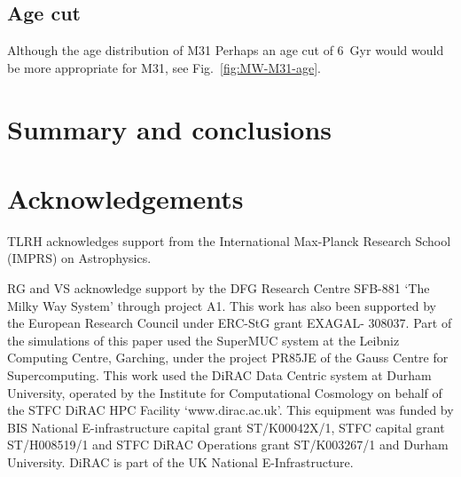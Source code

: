 \documentclass[a4paper,fleqn,usenatbib]{mnras}
\begin{document}
\subsection{Age cut}
Although the age distribution of M31 Perhaps an age cut of 6~Gyr would would be more 
appropriate for M31, see Fig.~\ref{fig:MW-M31-age}.




\section{Summary and conclusions}
\label{sec:conclusions}


\section*{Acknowledgements}
TLRH acknowledges support from the International Max-Planck Research School (IMPRS) on Astrophysics.


RG and VS acknowledge support by the DFG Research Centre SFB-881 `The
Milky Way System' through project A1. This work has also been
supported by the European Research Council under ERC-StG grant
EXAGAL- 308037. Part of the simulations of this paper used the
SuperMUC system at the Leibniz Computing Centre, Garching,
under the project PR85JE of the Gauss Centre for Supercomputing.
This work used the DiRAC Data Centric system at Durham
University, operated by the Institute for Computational Cosmology
on behalf of the STFC DiRAC HPC Facility `www.dirac.ac.uk'.
This equipment was funded by BIS National E-infrastructure capital 
grant ST/K00042X/1, STFC capital grant ST/H008519/1 and
STFC DiRAC Operations grant ST/K003267/1 and Durham University. 
DiRAC is part of the UK National E-Infrastructure.

\end{document}
